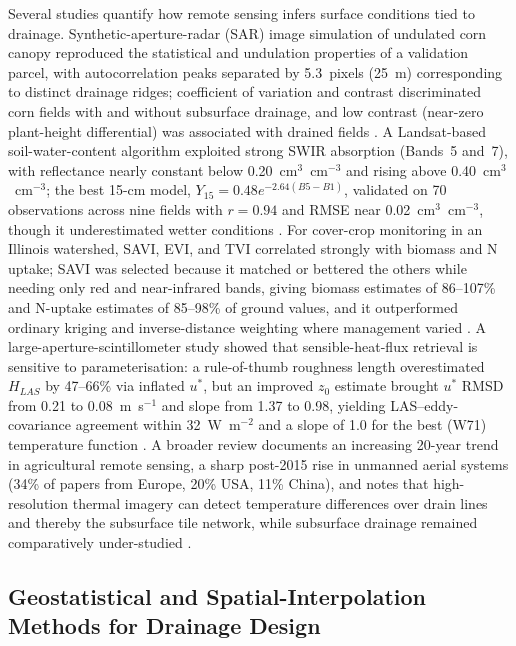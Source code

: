 Several studies quantify how remote sensing infers surface conditions tied to
drainage. Synthetic-aperture-radar (SAR) image simulation of undulated corn
canopy reproduced the statistical and undulation properties of a validation
parcel, with autocorrelation peaks separated by 5.3~pixels (25~m) corresponding
to distinct drainage ridges; coefficient of variation and contrast discriminated
corn fields with and without subsurface drainage, and low contrast (near-zero
plant-height differential) was associated with drained fields
\parencite{Meunier2001}. A Landsat-based soil-water-content algorithm exploited
strong SWIR absorption (Bands~5 and~7), with reflectance nearly constant below
0.20~cm$^3$~cm$^{-3}$ and rising above 0.40~cm$^3$~cm$^{-3}$; the best 15-cm
model, $Y_{15}=0.48e^{-2.64(B5-B1)}$, validated on 70 observations across nine
fields with $r=0.94$ and RMSE near 0.02~cm$^3$~cm$^{-3}$, though it
underestimated wetter conditions \parencite{Rijal2013}. For cover-crop
monitoring in an Illinois watershed, SAVI, EVI, and TVI correlated strongly with
biomass and N uptake; SAVI was selected because it matched or bettered the
others while needing only red and near-infrared bands, giving biomass estimates
of 86--107\% and N-uptake estimates of 85--98\% of ground values, and it
outperformed ordinary kriging and inverse-distance weighting where management
varied \parencite{Xu2018}. A large-aperture-scintillometer study showed that
sensible-heat-flux retrieval is sensitive to parameterisation: a rule-of-thumb
roughness length overestimated $H_{LAS}$ by 47--66\% via inflated $u^*$, but an
improved $z_0$ estimate brought $u^*$ RMSD from 0.21 to 0.08~m~s$^{-1}$ and slope
from 1.37 to 0.98, yielding LAS--eddy-covariance agreement within 32~W~m$^{-2}$
and a slope of 1.0 for the best (W71) temperature function \parencite{Zhang2010}.
A broader review documents an increasing 20-year trend in agricultural remote
sensing, a sharp post-2015 rise in unmanned aerial systems (34\% of papers from
Europe, 20\% USA, 11\% China), and notes that high-resolution thermal imagery
can detect temperature differences over drain lines and thereby the subsurface
tile network, while subsurface drainage remained comparatively under-studied
\parencite{Khanal2020}.

\subsection{Geostatistical and Spatial-Interpolation Methods for Drainage Design}


